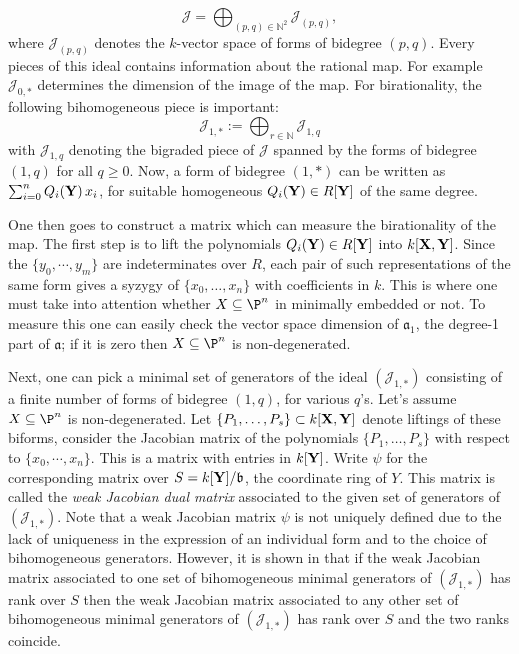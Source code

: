 \documentclass[11pt]{amsart}
\numberwithin{equation}{theorem}
\def\ff{{\bf f}}
\def\XX{{\bf X}}
\def\YY{{\bf Y}}
\renewcommand{\:}{\colon}
\DeclareMathOperator{\edim}{edim}
\theoremstyle{theorem}
\begin{document}

$${\mathcal J}=\bigoplus_{(p,q)\in \mathbb{N}^2} {\mathcal J}_{(p,q)},$$
where ${\mathcal J}_{(p,q)}$ denotes the $k$-vector space of forms of bidegree $(p,q)$.
Every pieces of this ideal contains information about the rational map. For example ${\mathcal J}_{0,*}$ determines the dimension of the image of the map.  
For birationality, the following bihomogeneous piece is  important:
$${\mathcal J}_{1,*}:=\bigoplus_{r\in\mathbb{N}} {\mathcal J}_{1,q}$$
with ${\mathcal J}_{1,q}$ denoting the bigraded piece of ${\mathcal J}$ spanned by the forms of bidegree
 $(1,q)$ for all $q\geq 0$. Now, a form of bidegree $(1,*)$ can be written as $\sum_{i=0}^n Q_i(\YY)\,x_i$, for suitable homogeneous $Q_i(\YY)\in  R[\YY]$
of the same degree. 

One then goes to construct a matrix which can measure the birationality of the map. The first step is to lift the polynomials $Q_i(\YY)\in  R[\YY]$ into $k[\XX,\YY]$. 
Since the $\{y_0,\cdots,y_m\}$ are indeterminates over $R$, each pair of such representations of the same form gives a syzygy of $\{x_0,\ldots,x_n\}$
with coefficients in $k$.  This is where one must take into attention whether $X\subseteq \P^n$ in minimally embedded  or not. To measure this one can easily check the vector space dimension of ${\mathfrak a}_1$, the degree-1 part of $\mathfrak a$; if it is zero  then $X\subseteq \P^n$ is non-degenerated. 



Next, one can pick a minimal set of generators of the ideal $({\mathcal J}_{1,*})$ consisting of a finite number
of forms of bidegree $(1,q)$, for various $q$'s.
Let's assume  $X\subseteq \P^n$ is non-degenerated. Let $\{P_1,\ldots,P_s\}\subset k[\XX,\YY]$ denote liftings of these biforms,  
 consider the Jacobian matrix of the polynomials $\{P_1,\ldots,P_s\}$ with respect to $\{x_0,\cdots,x_n\}$. This is a matrix with entries in $k[\YY]$. 
Write $\psi$ for the corresponding matrix over $S=k[\YY]/{\mathfrak b}$, the coordinate ring of $Y$. This matrix is called   the \emph{weak Jacobian dual matrix}  associated to
the given set of generators of $({\mathcal J}_{1,*})$.
Note that a weak Jacobian matrix $\psi$ is not uniquely defined due to the lack of uniqueness in the expression of
an individual form and to the choice of bihomogeneous generators. However, it is shown in \cite[Lemma 2.13]{DoriaHassanzadehSimisBirationality} that if the weak Jacobian matrix associated  to one set of bihomogeneous minimal generators of
$({\mathcal J}_{1,*})$ has  rank over $S$ then the weak Jacobian matrix associated to any other
set of bihomogeneous minimal generators of
$({\mathcal J}_{1,*})$ has  rank over $S$ and the two ranks coincide.
\end{document}
